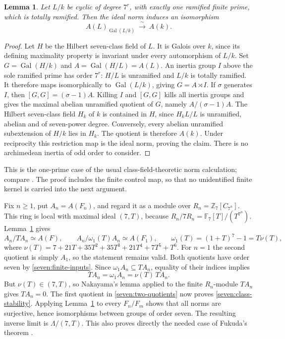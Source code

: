 \documentclass[11pt]{article}
\newtheorem{lemma}[theorem]{Lemma}
\begin{document}
\begin{lemma}\label{seven:norm-control}
Let $L/k$ be cyclic of degree $7^r$, with exactly one ramified finite prime,
which is totally ramified. Then the ideal norm induces an isomorphism
\[
 A(L)_{\operatorname{Gal}(L/k)}\ \xrightarrow{\ \sim\ }\ A(k).
 \tag{S29}\label{seven:coinvariant-control}
\]
\end{lemma}

\begin{proof}
Let $H$ be the Hilbert seven-class field of $L$. It is Galois over $k$,
since its defining maximality property is invariant under every
automorphism of $L/k$. Set
$G=\operatorname{Gal}(H/k)$ and
$A=\operatorname{Gal}(H/L)=A(L)$.
An inertia group $I$ above the sole ramified prime has order $7^r$:
$H/L$ is unramified and $L/k$ is totally ramified.
It therefore maps isomorphically to $\operatorname{Gal}(L/k)$, giving
$G=A\rtimes I$.
If $\sigma$ generates $I$, then $[G,G]=(\sigma-1)A$.
Killing $I$ and $[G,G]$ kills all inertia groups and gives the maximal
abelian unramified quotient of $G$, namely $A/(\sigma-1)A$.
The Hilbert seven-class field $H_k$ of $k$ is contained in $H$, since
$H_kL/L$ is unramified, abelian and of seven-power degree. Conversely,
every abelian unramified subextension of $H/k$ lies in $H_k$.
The quotient is therefore $A(k)$.
Under reciprocity this restriction map is the ideal norm, proving the
claim. There is no archimedean inertia of odd order to consider.
\end{proof}

This is the one-prime case of the usual class-field-theoretic norm
calculation; compare
\cite[Corollaries~1.3.9 and 1.3.12]{sevenSharifi}.
The proof includes the finite control map, so that no unidentified
finite kernel is carried into the next argument.

Fix $n\ge1$, put $A_n=A(F_n)$, and regard it as a module over
$R_n=\mathbb Z_7[C_{7^n}]$.
This ring is local with maximal ideal $(7,T)$, because
$R_n/7R_n=\mathbb F_7[T]/(T^{7^n})$.
Lemma~\ref{seven:norm-control} gives
\[
 A_n/TA_n\simeq A(F),\qquad
 A_n/\omega_1(T)A_n\simeq A(F_1),\qquad
 \omega_1(T)=(1+T)^7-1=T\nu(T),
 \tag{S30}\label{seven:two-quotients}
\]
where
$\nu(T)=7+21T+35T^2+35T^3+21T^4+7T^5+T^6$.
For $n=1$ the second quotient is simply $A_1$, so the statement remains
valid. Both quotients have order seven by \eqref{seven:finite-inputs}.
Since $\omega_1A_n\subseteq TA_n$, equality of their indices implies
\[
 TA_n=\omega_1A_n=\nu(T)\,TA_n.
\]
But $\nu(T)\in(7,T)$, so Nakayama's lemma applied to the finite
$R_n$-module $TA_n$ gives $TA_n=0$.
The first quotient in \eqref{seven:two-quotients} now proves
\eqref{seven:class-stability}.
Applying Lemma~\ref{seven:norm-control} to every $F_n/F_m$ shows that all
norms are surjective, hence isomorphisms between groups of order seven.
The resulting inverse limit is $\Lambda/(7,T)$.
This also proves directly the needed case of Fukuda's theorem
\cite[Theorem~1(1)]{sevenFukuda1994}.
\end{document}
